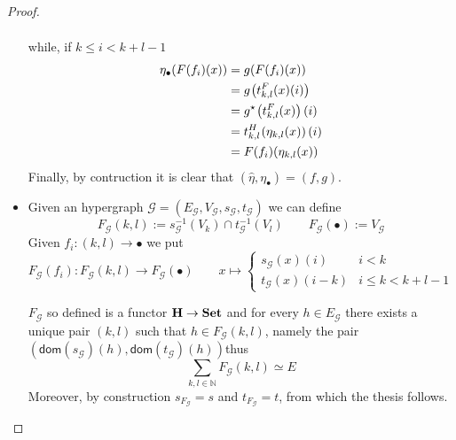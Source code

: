 \documentclass[3p]{elsarticle}
\newcommand{\catname}[1]{\textbf{\textup{#1}}}
\newcommand{\dom}{\mathsf{dom}}
\theoremstyle{remark}
\theoremstyle{definition}
\begin{document}
\begin{proof}
\begin{itemize}
\begin{align*}
		\end{align*}
		while, if $k\leq i < k+l-1$
		\begin{align*}
			\eta_\bullet(F(f_i)(x))&=g(F(f_i)(x))\\&=g\hspace{-1pt}\left(t^F_{k,l}(x)(i)\right)\\&=g^\star\hspace{-1pt}\left(t^F_{k,l}(x)\right)(i)\\&=t^H_{k,l}\hspace{-1pt}\left(\eta_{k,l}(x)\right)(i)\\&=F(f_i)(\eta_{k,l}(x))
		\end{align*}
		Finally, by contruction it is clear that $(\hat{\eta}, \eta_{\bullet})=(f,g)$. 
		\item Given an hypergraph $\mathcal{G}=(E_\mathcal{G}, V_\mathcal{G}, s_\mathcal{G}, t_\mathcal{G})$ we can define 
		\[F_{\mathcal{G}}(k,l):=s_\mathcal{G}^{-1}(V_k)\cap t_\mathcal{G}^{-1}(V_l) \qquad F_{\mathcal{G}}(\bullet):=V_\mathcal{G}\]
		Given $f_i\colon (k,l)\to \bullet$ we put
		\[F_{\mathcal{G}}(f_i)\colon F_{\mathcal{G}}(k,l)\to F_{\mathcal{G}}(\bullet) \qquad x\mapsto \begin{cases}
			s_\mathcal{G}(x)(i) & i<k\\
			t_\mathcal{G}(x) (i-k) &i\leq k < k+l-1
		\end{cases}  \]
		
		$F_{\mathcal{G}}$ so defined is a functor $\catname{H}\to \catname{Set}$ and for every $h\in E_\mathcal{G}$ there exists a unique pair $(k,l)$ such that $h\in F_{\mathcal{G}}(k,l) $, namely the pair $(\dom(s_\mathcal{G})(h), \dom(t_\mathcal{G})(h))$thus
		\[\sum_{k,l\in \mathbb{N}}F_{\mathcal{G}}(k,l)\simeq E\]
		Moreover, by construction $s_{F_{\mathcal{G}}}=s$ and $t_{F_{\mathcal{G}}}=t$, from which the thesis follows. \qedhere
	\end{itemize}
\end{proof}
\end{document}
